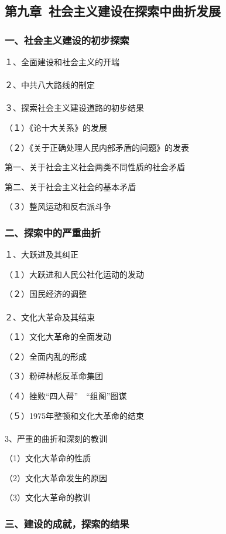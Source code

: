 \documentclass{ctexart}
\begin{document}
\subsection{第九章\ 社会主义建设在探索中曲折发展}

\subsubsection{一、社会主义建设的初步探索}

１、全面建设和社会主义的开端
\\\\

２、中共八大路线的制定
\\\\

３、探索社会主义建设道路的初步结果

（１）《论十大关系》的发展

（２）《关于正确处理人民内部矛盾的问题》的发表

第一、关于社会主义社会两类不同性质的社会矛盾

第二、关于社会主义社会的基本矛盾

（３）整风运动和反右派斗争

\subsubsection{二、探索中的严重曲折}

１、大跃进及其纠正

（１）大跃进和人民公社化运动的发动

（２）国民经济的调整
\\\\

２、文化大革命及其结束

（１）文化大革命的全面发动

（２）全面内乱的形成

（３）粉碎林彪反革命集团

（４）挫败“四人帮”　“组阁”图谋

（５）1975年整顿和文化大革命的结束
\\\\

3、严重的曲折和深刻的教训

（1）文化大革命的性质

（2）文化大革命发生的原因

（3）文化大革命的教训

\subsubsection{三、建设的成就，探索的结果}
\end{document}
